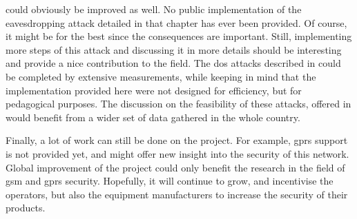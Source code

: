    could obviously be improved as well.
  No public implementation of the eavesdropping attack detailed in that
  chapter has ever been provided. Of course, it might be for the best
  since the consequences are important. Still, implementing more steps
  of this attack and discussing it in more details should be interesting
  and provide a nice contribution to the field. The \gls{dos} attacks
  described in  could be completed by extensive
  measurements, while keeping in mind that the implementation provided
  here were not designed for efficiency, but for pedagogical purposes.
  The discussion on the feasibility of these attacks, offered in
   would
  benefit from a wider set of data gathered in the whole country. 

  Finally, a lot of work can still be done on the 
  project. For example, \gls{gprs} support is not provided yet, and
  might offer new insight into the security of this network. Global
  improvement of the project could only benefit the research in the
  field of \gls{gsm} and \gls{gprs} security. Hopefully, it will
  continue to grow, and incentivise the operators, but also the equipment
  manufacturers to increase the security of their products.
